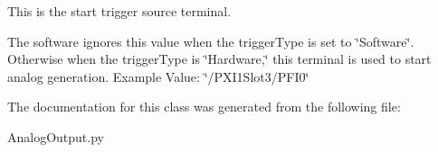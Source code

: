 This is the start trigger source terminal. 

The software ignores this value when the trigger\-Type is set to \char`\"{}\-Software\char`\"{}. Otherwise when the trigger\-Type is \char`\"{}\-Hardware,\char`\"{} this terminal is used to start analog generation. Example Value\-: \char`\"{}/\-P\-X\-I1\-Slot3/\-P\-F\-I0\char`\"{} 

The documentation for this class was generated from the following file\-:\begin{DoxyCompactItemize}
\item 
Analog\-Output.\-py\end{DoxyCompactItemize}
